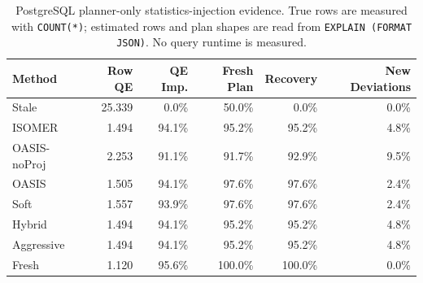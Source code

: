 \begin{table}[t]
  \centering
  \small
  \caption{PostgreSQL planner-only statistics-injection evidence. True rows are measured with \texttt{COUNT(*)}; estimated rows and plan shapes are read from \texttt{EXPLAIN (FORMAT JSON)}. No query runtime is measured.}
  \label{tab:postgres_planner_stats_injection}
  \setlength{\tabcolsep}{4pt}
  \begin{tabular}{lrrrrr}
    \toprule
    Method & Row QE & QE Imp. & Fresh Plan & Recovery & New Deviations \\
    \midrule
    Stale & 25.339 & 0.0\% & 50.0\% & 0.0\% & 0.0\% \\
    ISOMER & 1.494 & 94.1\% & 95.2\% & 95.2\% & 4.8\% \\
    OASIS-noProj & 2.253 & 91.1\% & 91.7\% & 92.9\% & 9.5\% \\
    OASIS & 1.505 & 94.1\% & 97.6\% & 97.6\% & 2.4\% \\
    Soft & 1.557 & 93.9\% & 97.6\% & 97.6\% & 2.4\% \\
    Hybrid & 1.494 & 94.1\% & 95.2\% & 95.2\% & 4.8\% \\
    Aggressive & 1.494 & 94.1\% & 95.2\% & 95.2\% & 4.8\% \\
    Fresh & 1.120 & 95.6\% & 100.0\% & 100.0\% & 0.0\% \\
    \bottomrule
  \end{tabular}
\end{table}
